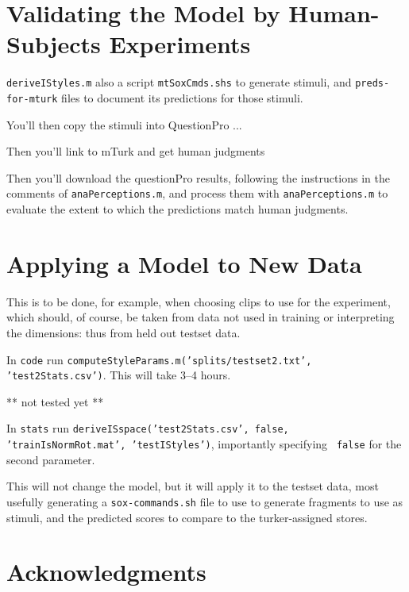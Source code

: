 \documentclass[11pt]{article}
\begin{document}
\section{Validating the Model by Human-Subjects Experiments}

{\tt deriveIStyles.m} also a script {\tt mtSoxCmds.shs} to generate
stimuli, and {\tt preds-for-mturk} files to document its predictions
for those stimuli.

You'll then copy the stimuli into QuestionPro ...

Then you'll link to mTurk and get human judgments

Then you'll download the questionPro results, following the
instructions in the comments of {\tt anaPerceptions.m}, and process
them with {\tt anaPerceptions.m} to evaluate the extent to which the predictions match human judgments. 


\section{Applying a Model to New Data}

This is to be done, for example, when choosing clips to use for the
experiment, which should, of course, be taken from data not used in
training or interpreting the dimensions: thus from held out testset
data.

In {\tt code} run {\tt computeStyleParams.m('splits/testset2.txt',
  'test2Stats.csv')}.  This will take  3--4 hours.

** not tested yet **

In {\tt stats} run {\tt deriveISspace('test2Stats.csv', false,
  'trainIsNormRot.mat', 'testIStyles')}, importantly specifying {\tt
  false} for the second parameter.

This will not change the model, but it will apply it to the testset
data, most usefully generating a {\tt sox-commands.sh} file to use to
generate fragments to use as stimuli, and the predicted scores to
compare to the turker-assigned stores. 


\section{Acknowledgments }  



%

\end{document}
